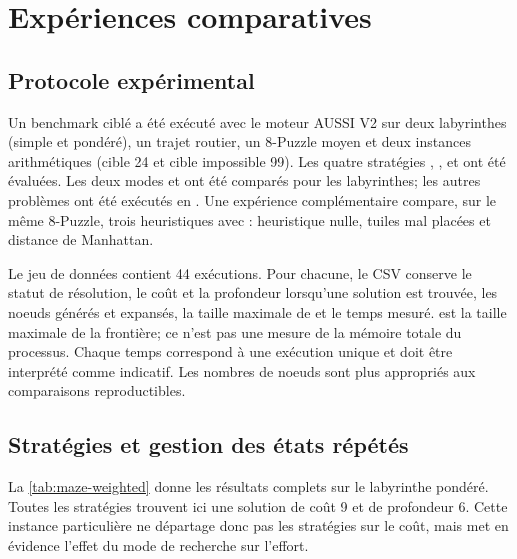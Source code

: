 \section{Expériences comparatives}
\label{sec:experiences}

\subsection{Protocole expérimental}

Un benchmark ciblé a été exécuté avec le moteur AUSSI V2 sur deux labyrinthes
(simple et pondéré), un trajet routier, un 8-Puzzle moyen et deux instances
arithmétiques (cible 24 et cible impossible 99). Les quatre stratégies
\BFS{}, \UCS{}, \Greedy{} et \AStar{} ont été évaluées. Les deux modes
\TreeSearch{} et \GraphSearch{} ont été comparés pour les labyrinthes; les
autres problèmes ont été exécutés en \GraphSearch{}. Une expérience
complémentaire compare, sur le même 8-Puzzle, trois heuristiques avec \AStar{} :
heuristique nulle, tuiles mal placées et distance de Manhattan.

Le jeu de données contient 44 exécutions. Pour chacune, le CSV conserve le
statut de résolution, le coût et la profondeur lorsqu'une solution est trouvée,
les noeuds générés et expansés, la taille maximale de  et le temps
mesuré.  est la taille maximale de la frontière; ce n'est pas
une mesure de la mémoire totale du processus. Chaque temps correspond à une
exécution unique et doit être interprété comme indicatif. Les nombres de noeuds
sont plus appropriés aux comparaisons reproductibles.

\subsection{Stratégies et gestion des états répétés}

La \cref{tab:maze-weighted} donne les résultats complets sur le labyrinthe
pondéré. Toutes les stratégies trouvent ici une solution de coût 9 et de
profondeur 6. Cette instance particulière ne départage donc pas les stratégies
sur le coût, mais met en évidence l'effet du mode de recherche sur l'effort.

